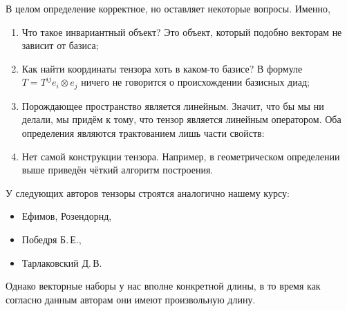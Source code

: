 В целом определение корректное, но оставляет некоторые вопросы. Именно,
\begin{enumerate}
  \item Что такое инвариантный объект? Это объект, который подобно векторам не
    зависит от базиса;
  \item Как найти координаты тензора хоть в каком-то базисе? В формуле
    $T = T^{ij} e_i \otimes e_j$ ничего не говорится о происхождении базисных
    диад;

  \item Порождающее пространство является линейным. Значит, что бы мы ни делали,
    мы придём к тому, что тензор является
    линейным оператором. Оба определения являются трактованием лишь части
    свойств:
    \begin{figure}[H]
    	\centering
    	
    \end{figure}

  \item Нет самой конструкции тензора. Например, в геометрическом определении
    выше приведён чёткий алгоритм 
    построения.
\end{enumerate}

У следующих авторов тензоры строятся аналогично нашему курсу:
\begin{itemize}[label=--]
  \item Ефимов, Розендорнд,
  \item Победря Б.\,Е.,
  \item Тарлаковский Д.\,В.
\end{itemize}
Однако векторные наборы у нас вполне конкретной длины, в то время как согласно
данным
авторам они имеют произвольную длину.


